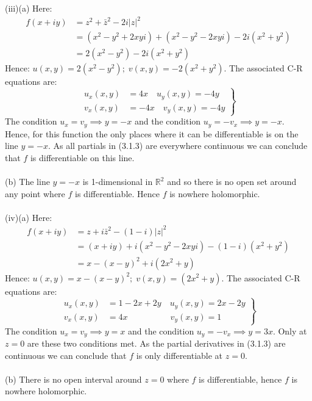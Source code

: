 \documentclass[12pt,a4paper]{article}
\begin{document}
\newpage
\noindent
(iii)(a) Here:
\begin{align*}
  f(x+iy) &= z^2 + \bar{z}^2 -2i|z|^2 \\
  &= (x^2 - y^2 + 2xyi) + (x^2 - y^2 -2xyi) -2i(x^2+y^2) \\
  &= 2(x^2 - y^2) - 2i(x^2+y^2)
\end{align*}
Hence: $u(x,y) = 2(x^2 - y^2); \; v(x,y)=-2(x^2+y^2)$.  The associated C-R equations are:
\begin{equation*}
\left.
\begin{aligned}
    u_x(x,y) &= 4x \quad u_y(x,y) = -4y \\
    v_x(x,y) &= -4x \quad v_y(x,y) = -4y
\end{aligned}
\right\}
\tag{3.1.3}
\end{equation*}
The condition $u_x=v_y \implies y=-x$ and the condition $u_y=-v_x \implies y=-x$.  Hence, for this function the only places where
it can be differentiable is on the line $y=-x$.  As all partials in (3.1.3) are everywhere continuous we can conclude that $f$ is differentiable
on this line.\\
\\
(b) The line $y=-x$ is 1-dimensional in $\mathbb{R}^2$ and so there is no open set around any point where $f$ is differentiable.
Hence $f$ is nowhere holomorphic.\\
\\
(iv)(a) Here:
\begin{align*}
  f(x+iy) &= z + i\bar{z}^2 - (1-i)|z|^2 \\
  &= (x+iy) + i(x^2-y^2-2xyi) - (1-i)(x^2+y^2) \\
  &= x - (x-y)^2 + i(2x^2+y)
\end{align*}
Hence: $u(x,y) = x-(x-y)^2; \; v(x,y)=(2x^2+y)$.  The associated C-R equations are:
\begin{equation*}
\left.
\begin{aligned}
    u_x(x,y) &= 1-2x+2y \quad u_y(x,y) = 2x - 2y \\
    v_x(x,y) &= 4x \quad\quad\quad\quad\quad v_y(x,y) = 1
\end{aligned}
\right\}
\tag{3.1.3}
\end{equation*}
The condition $u_x=v_y \implies y=x$ and the condition $u_y=-v_x \implies y=3x$. Only at $z=0$ are these
two conditions met.  As the partial derivatives in (3.1.3) are continuous we can conclude that $f$ is only differentiable
at $z=0$.\\
\\
(b) There is no open interval around $z=0$ where $f$ is differentiable, hence $f$ is nowhere holomorphic.
\end{document}
